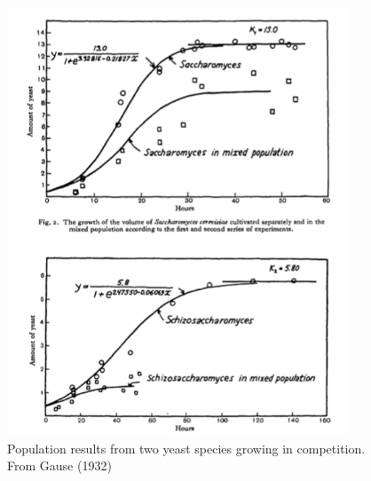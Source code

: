 \documentclass[
]{book}
\theoremstyle{definition}
\theoremstyle{definition}
\theoremstyle{definition}
\theoremstyle{remark}
\begin{document}
\begin{figure}
\includegraphics[width=4in]{figures/06-coupledSystems/gause-results} \caption{\label{fig:gause}Population results from two yeast species growing in competition. From Gause (1932)}\label{fig:unnamed-chunk-112}
\end{figure}
\end{document}
